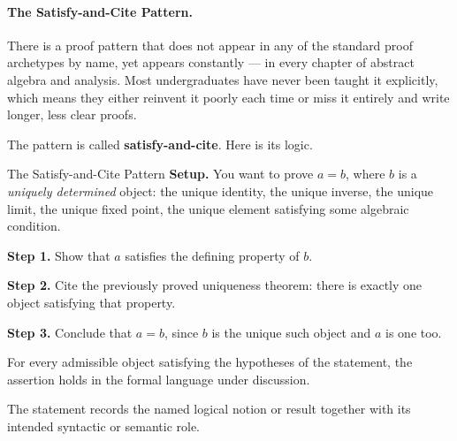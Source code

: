 \paragraph{The Satisfy-and-Cite Pattern.}
\label{sec:satisfy-cite}

There is a proof pattern that does not appear in any of the standard
proof archetypes by name, yet appears constantly --- in every chapter of
abstract algebra and analysis. Most undergraduates have never been taught
it explicitly, which means they either reinvent it poorly each time or
miss it entirely and write longer, less clear proofs.

The pattern is called \textbf{satisfy-and-cite}. Here is its logic.

\begin{propositionbox}{The Satisfy-and-Cite Pattern}
\textbf{Setup.} You want to prove $a = b$, where $b$ is a
\emph{uniquely determined} object: the unique identity, the unique
inverse, the unique limit, the unique fixed point, the unique
element satisfying some algebraic condition.

\medskip
\textbf{Step 1.} Show that $a$ satisfies the defining property of $b$.

\textbf{Step 2.} Cite the previously proved uniqueness theorem: there is
exactly one object satisfying that property.

\textbf{Step 3.} Conclude that $a = b$, since $b$ is the unique such object
and $a$ is one too.
\end{propositionbox}
\begin{remark*}
For every admissible object satisfying the hypotheses of the statement, the
assertion holds in the formal language under discussion.
\end{remark*}

\begin{remark*}[Interpretation]
The statement records the named logical notion or result together with its
intended syntactic or semantic role.
\end{remark*}


